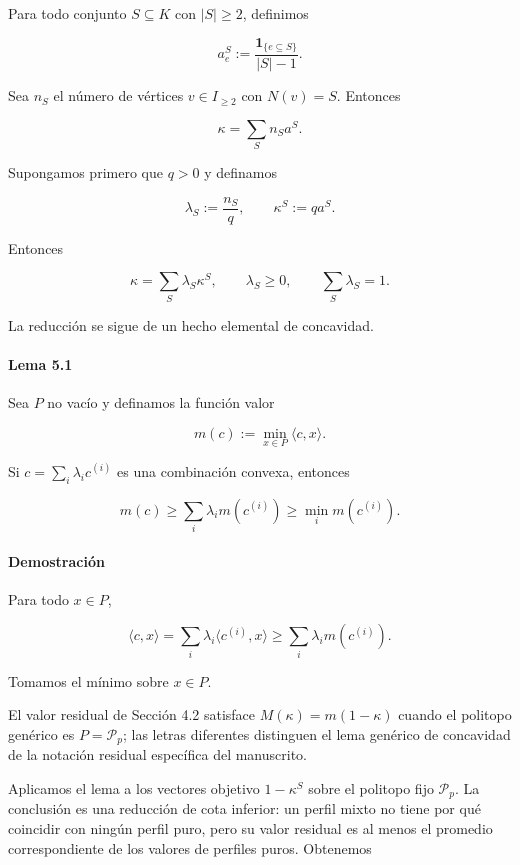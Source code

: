 \documentclass[
  spanish,
  11pt,
  a4paper,
]{article}
\begin{document}
Para todo conjunto \(S\subseteq K\) con \(|S|\ge2\), definimos

\[
a_e^S
:=
\frac{\mathbf1_{\{e\subseteq S\}}}{|S|-1}.
\tag{5.1}
\]

Sea \(n_S\) el número de vértices \(v\in I_{\ge2}\) con \(N(v)=S\). Entonces

\[
\kappa=\sum_Sn_Sa^S.
\tag{5.2}
\]

Supongamos primero que \(q>0\) y definamos

\[
\lambda_S:=\frac{n_S}{q},
\qquad
\kappa^S:=qa^S.
\]

Entonces

\[
\kappa=\sum_S\lambda_S\kappa^S,
\qquad
\lambda_S\ge0,
\qquad
\sum_S\lambda_S=1.
\tag{5.3}
\]

La reducción se sigue de un hecho elemental de concavidad.

\paragraph{Lema 5.1}\label{lema-5.1}

Sea \(P\) no vacío y definamos la función valor

\[
m(c):=\min_{x\in P}\langle c,x\rangle.
\]

Si \(c=\sum_i\lambda_ic^{(i)}\) es una combinación convexa, entonces

\[
m(c)
\ge
\sum_i\lambda_i m(c^{(i)})
\ge
\min_i m(c^{(i)}).
\]

\paragraph{Demostración}\label{demostraciuxf3n-1}

Para todo \(x\in P\),

\[
\langle c,x\rangle
=
\sum_i\lambda_i\langle c^{(i)},x\rangle
\ge
\sum_i\lambda_i m(c^{(i)}).
\]

Tomamos el mínimo sobre \(x\in P\).

El valor residual de Sección 4.2 satisface \(M(\kappa)=m(1-\kappa)\) cuando el politopo genérico es \(P=\mathcal P_p\); las letras diferentes distinguen el lema genérico de concavidad de la notación residual específica del manuscrito.

Aplicamos el lema a los vectores objetivo \(1-\kappa^S\) sobre el politopo fijo \(\mathcal P_p\). La conclusión es una reducción de cota inferior: un perfil mixto no tiene por qué coincidir con ningún perfil puro, pero su valor residual es al menos el promedio correspondiente de los valores de perfiles puros. Obtenemos
\end{document}
